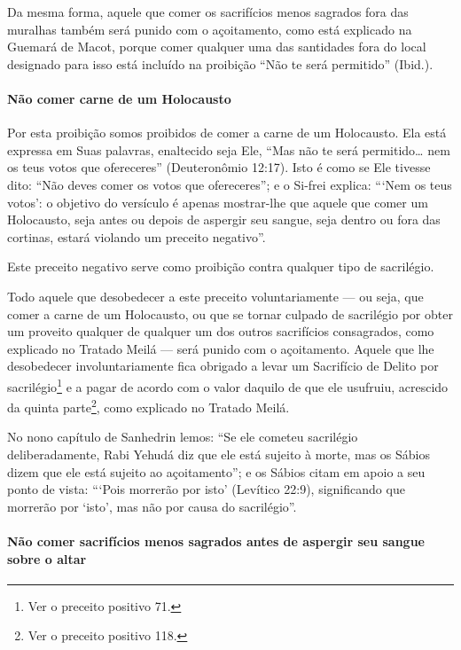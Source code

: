 Da mesma forma, aquele que comer os sacrifícios menos sagrados fora das
muralhas também será punido com o açoitamento, como está explicado na
Guemará de Macot, porque comer qualquer uma das santidades fora do local
designado para isso está incluído na proibição ``Não te será permitido''
(Ibid.).

\paragraph{Não comer carne de um Holocausto}

Por esta proibição somos proibidos de comer a carne de um Holocausto.
Ela está expressa em Suas palavras, enaltecido seja Ele, ``Mas não te
será permitido\ldots{} nem os teus votos que ofereceres'' (Deuteronômio
12:17). Isto é como se Ele tivesse dito: ``Não deves comer os votos que
ofereceres''; e o Si-frei explica: ```Nem os teus votos': o objetivo do
versículo é apenas mostrar-lhe que aquele que comer um Holocausto, seja
antes ou depois de aspergir seu sangue, seja dentro ou fora das
cortinas, estará violando um preceito negativo''.

Este preceito negativo serve como proibição contra qualquer tipo de
sacrilégio.

Todo aquele que desobedecer a este preceito voluntariamente --- ou seja,
que comer a carne de um Holocausto, ou que se tornar culpado de
sacrilégio por obter um proveito qualquer de qualquer um dos outros
sacrifícios consagrados, como explicado no Tratado Meilá --- será
punido com o açoitamento. Aquele que lhe desobedecer involuntariamente
fica obrigado a levar um Sacrifício de Delito por
sacrilégio\footnote{Ver o preceito positivo 71.} e a pagar de acordo com o valor daquilo
de que ele usufruiu, acrescido da quinta parte\footnote{Ver o preceito positivo 118.},
como explicado no Tratado Meilá.

No nono capítulo de Sanhedrin lemos: ``Se ele cometeu sacrilégio
deliberadamente, Rabi Yehudá diz que ele está sujeito à morte, mas os
Sábios dizem que ele está sujeito ao açoitamento''; e os Sábios citam em
apoio a seu ponto de vista: ```Pois morrerão por isto' (Levítico 22:9),
significando que morrerão por `isto', mas não por causa do
sacrilégio''.

\paragraph{Não comer sacrifícios menos sagrados antes de aspergir seu sangue sobre o altar}

